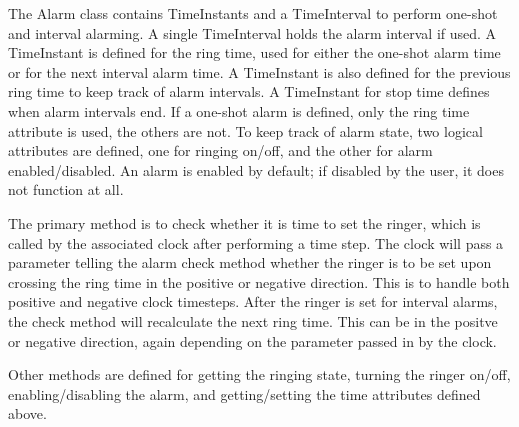 
The Alarm class contains TimeInstants and a TimeInterval to perform one-shot
and interval alarming.  A single TimeInterval holds the alarm interval if
used.  A TimeInstant is defined for the ring time, used for either the one-shot
alarm time or for the next interval alarm time.  A TimeInstant is also
defined for the previous ring time to keep track of alarm intervals.
A TimeInstant for stop time defines when alarm intervals end.  If a one-shot
alarm is defined, only the ring time attribute is used, the others are not.
To keep track of alarm state, two logical attributes are defined, one for
ringing on/off, and the other for alarm enabled/disabled.  An alarm is 
enabled by default; if disabled by the user, it does not function at all.

The primary method is to check whether it is time to set the ringer, which
is called by the associated clock after performing a time step.  The clock
will pass a parameter telling the alarm check method whether the ringer is
to be set upon crossing the ring time in the positive or negative direction.
This is to handle both positive and negative clock timesteps.  After the
ringer is set for interval alarms, the check method will recalculate the
next ring time.  This can be in the positve or negative direction, again
depending on the parameter passed in by the clock.

Other methods are defined for getting the ringing state, turning the
ringer on/off, enabling/disabling the alarm, and getting/setting the
time attributes defined above.
